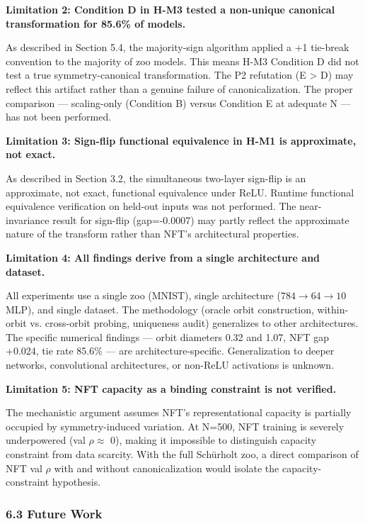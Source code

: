 \textbf{Limitation 2: Condition D in H-M3 tested a non-unique canonical transformation for 85.6\% of models.}

As described in Section 5.4, the majority-sign algorithm applied a +1 tie-break convention to the majority of zoo models. This means H-M3 Condition D did not test a true symmetry-canonical transformation. The P2 refutation (E > D) may reflect this artifact rather than a genuine failure of canonicalization. The proper comparison --- scaling-only (Condition B) versus Condition E at adequate N --- has not been performed.

\textbf{Limitation 3: Sign-flip functional equivalence in H-M1 is approximate, not exact.}

As described in Section 3.2, the simultaneous two-layer sign-flip is an approximate, not exact, functional equivalence under ReLU. Runtime functional equivalence verification on held-out inputs was not performed. The near-invariance result for sign-flip (gap=-0.0007) may partly reflect the approximate nature of the transform rather than NFT's architectural properties.

\textbf{Limitation 4: All findings derive from a single architecture and dataset.}

All experiments use a single zoo (MNIST), single architecture ($784\rightarrow 64\rightarrow 10$ MLP), and single dataset. The methodology (oracle orbit construction, within-orbit vs. cross-orbit probing, uniqueness audit) generalizes to other architectures. The specific numerical findings --- orbit diameters 0.32 and 1.07, NFT gap +0.024, tie rate 85.6\% --- are architecture-specific. Generalization to deeper networks, convolutional architectures, or non-ReLU activations is unknown.

\textbf{Limitation 5: NFT capacity as a binding constraint is not verified.}

The mechanistic argument assumes NFT's representational capacity is partially occupied by symmetry-induced variation. At N=500, NFT training is severely underpowered (val $\rho \approx$ 0), making it impossible to distinguish capacity constraint from data scarcity. With the full Schürholt zoo, a direct comparison of NFT val $\rho$ with and without canonicalization would isolate the capacity-constraint hypothesis.

\subsubsection{6.3 Future Work}

